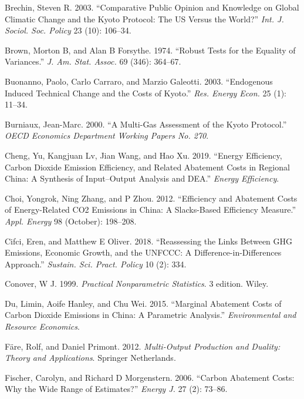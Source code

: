 \documentclass[
  10pt,
]{article}
\begin{document}
\leavevmode\hypertarget{ref-Brechin2003}{}%
Brechin, Steven R. 2003. ``Comparative Public Opinion and Knowledge on
Global Climatic Change and the Kyoto Protocol: The US Versus the
World?'' \emph{Int. J. Sociol. Soc. Policy} 23 (10): 106--34.

\leavevmode\hypertarget{ref-Brown1974}{}%
Brown, Morton B, and Alan B Forsythe. 1974. ``Robust Tests for the
Equality of Variances.'' \emph{J. Am. Stat. Assoc.} 69 (346): 364--67.

\leavevmode\hypertarget{ref-Buonanno2003}{}%
Buonanno, Paolo, Carlo Carraro, and Marzio Galeotti. 2003. ``Endogenous
Induced Technical Change and the Costs of Kyoto.'' \emph{Res. Energy
Econ.} 25 (1): 11--34.

\leavevmode\hypertarget{ref-Burniaux2000}{}%
Burniaux, Jean-Marc. 2000. ``A Multi-Gas Assessment of the Kyoto
Protocol.'' \emph{OECD Economics Department Working Papers No. 270}.

\leavevmode\hypertarget{ref-Cheng2019}{}%
Cheng, Yu, Kangjuan Lv, Jian Wang, and Hao Xu. 2019. ``Energy
Efficiency, Carbon Dioxide Emission Efficiency, and Related Abatement
Costs in Regional China: A Synthesis of Input--Output Analysis and
DEA.'' \emph{Energy Efficiency}.

\leavevmode\hypertarget{ref-Choi2012}{}%
Choi, Yongrok, Ning Zhang, and P Zhou. 2012. ``Efficiency and Abatement
Costs of Energy-Related CO2 Emissions in China: A Slacks-Based
Efficiency Measure.'' \emph{Appl. Energy} 98 (October): 198--208.

\leavevmode\hypertarget{ref-Cifci2018}{}%
Cifci, Eren, and Matthew E Oliver. 2018. ``Reassessing the Links Between
GHG Emissions, Economic Growth, and the UNFCCC: A
Difference-in-Differences Approach.'' \emph{Sustain. Sci. Pract. Policy}
10 (2): 334.

\leavevmode\hypertarget{ref-Conover1999}{}%
Conover, W J. 1999. \emph{Practical Nonparametric Statistics}. 3
edition. Wiley.

\leavevmode\hypertarget{ref-Du2015}{}%
Du, Limin, Aoife Hanley, and Chu Wei. 2015. ``Marginal Abatement Costs
of Carbon Dioxide Emissions in China: A Parametric Analysis.''
\emph{Environmental and Resource Economics}.

\leavevmode\hypertarget{ref-Fare2012}{}%
Färe, Rolf, and Daniel Primont. 2012. \emph{Multi-Output Production and
Duality: Theory and Applications}. Springer Netherlands.

\leavevmode\hypertarget{ref-Fischer2006}{}%
Fischer, Carolyn, and Richard D Morgenstern. 2006. ``Carbon Abatement
Costs: Why the Wide Range of Estimates?'' \emph{Energy J.} 27 (2):
73--86.
\end{document}
